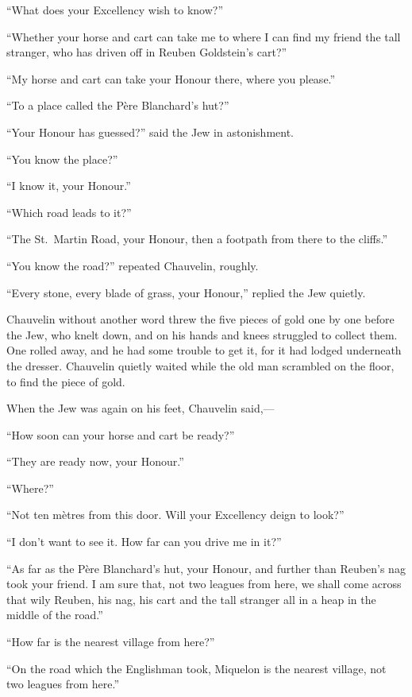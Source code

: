 \documentclass[paper=5.5in:8.5in,BCOR=7mm,twoside,DIV=calc,12pt,usegeometry,chapterprefix,endperiod,headings=big]{scrbook}
\begin{document}
\enquote{What does your Excellency wish to know?}

\enquote{Whether your horse and cart can take me to where I can find my friend the tall stranger, who has driven off in Reuben Goldstein's cart?}

\enquote{My horse and cart can take your Honour there, where you please.}

\enquote{To a place called the Père Blanchard's hut?}

\enquote{Your Honour has guessed?} said the Jew in astonishment.

\enquote{You know the place?}

\enquote{I know it, your Honour.}

\enquote{Which road leads to it?}

\enquote{The St.~Martin Road, your Honour, then a footpath from there to the cliffs.}

\enquote{You know the road?} repeated Chauvelin, roughly.

\enquote{Every stone, every blade of grass, your Honour,} replied the Jew quietly.

Chauvelin without another word threw the five pieces of gold one by one before the Jew, who knelt down, and on his hands and knees struggled to collect them. One rolled away, and he had some trouble to get it, for it had lodged underneath the dresser. Chauvelin quietly waited while the old man scrambled on the floor, to find the piece of gold.

When the Jew was again on his feet, Chauvelin said,---

\enquote{How soon can your horse and cart be ready?}

\enquote{They are ready now, your Honour.}

\enquote{Where?}

\enquote{Not ten mètres from this door. Will your Excellency deign to look?}

\enquote{I don't want to see it. How far can you drive me in it?}

\enquote{As far as the Père Blanchard's hut, your Honour, and further than Reuben's nag took your friend. I am sure that, not two leagues from here, we shall come across that wily Reuben, his nag, his cart and the tall stranger all in a heap in the middle of the road.}

\enquote{How far is the nearest village from here?}

\enquote{On the road which the Englishman took, Miquelon is the nearest village, not two leagues from here.}
\end{document}
